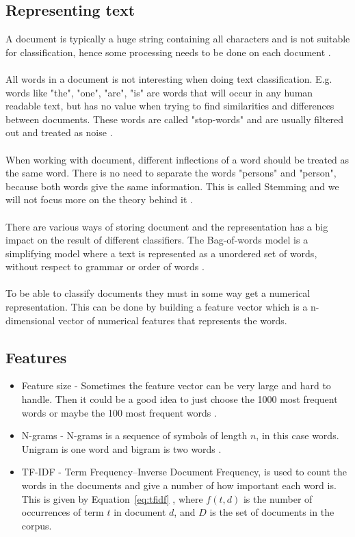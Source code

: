 \subsection{Representing text}
A document is typically a huge string containing all characters and is not
suitable for classification, hence some processing needs to be done on each
document \cite{ngrams_ai}.
\\\\
All words in a document is not interesting when doing text classification. E.g.
words like "the", "one", "are", "is" are words that will occur in any human
readable text, but has no value when trying to find similarities and
differences between documents. These words are called "stop-words" and are
usually filtered out and treated as noise \cite{joachims}.
\\\\
When working with document, different inflections of a word should be treated
as the same word. There is no need to separate the words "persons" and
"person", because both words give the same information. This is called Stemming
and we will not focus more on the theory behind it \cite{stemming}.
\\\\
There are various ways of storing document and the representation has a big
impact on the result of different classifiers. The Bag-of-words model is a
simplifying model where a text is represented as a unordered set of words,
without respect to grammar or order of words \citep{bag_of_words}.
\\\\
To be able to classify documents they must in some way get a numerical representation. 
This can be done by building a feature vector which is a n-dimensional vector of numerical 
features that represents the words.
\subsection{Features}
\begin{itemize}
\item Feature size - Sometimes the feature vector can be very large and hard to
        handle. Then it could be a good idea to just choose the 1000 most
        frequent words or maybe the 100 most frequent words \citep{joachims}.
\item N-grams - N-grams is a sequence of symbols of length $n$, in this case
        words. Unigram is one word and bigram is two words \citep{ngrams_ai}.
\item TF-IDF - Term Frequency–Inverse Document Frequency, is used to count the
        words in the documents and give a number of how important each word is.
        \\This is given by Equation~\ref{eq:tfidf} \citep{tfidf}, where $f(t,d)$ is the number of occurrences of term $t$ in document $d$, and $D$ is the set of documents in the corpus.
\end{itemize}

